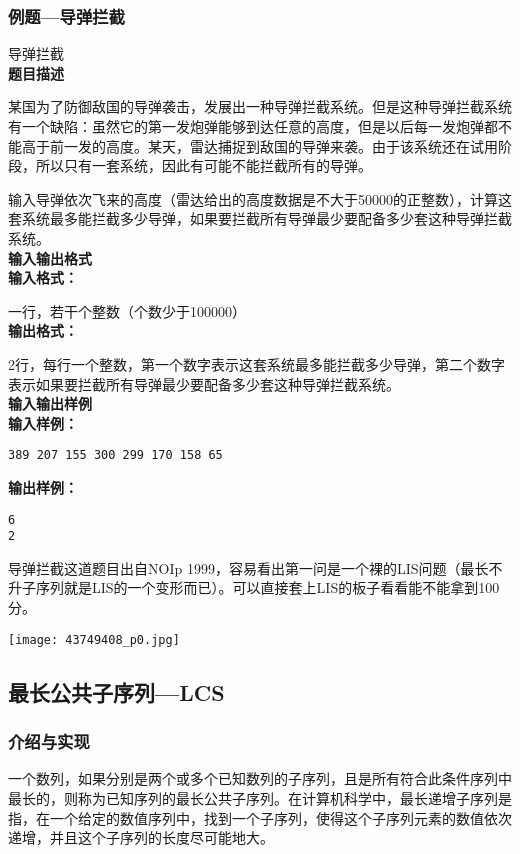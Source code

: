 \subsubsection{例题---导弹拦截}
\begin{example}导弹拦截\\
	\textbf{题目描述}

	某国为了防御敌国的导弹袭击，发展出一种导弹拦截系统。但是这种导弹拦截系统有一个缺陷：虽然它的第一发炮弹能够到达任意的高度，但是以后每一发炮弹都不能高于前一发的高度。某天，雷达捕捉到敌国的导弹来袭。由于该系统还在试用阶段，所以只有一套系统，因此有可能不能拦截所有的导弹。

	输入导弹依次飞来的高度（雷达给出的高度数据是不大于50000的正整数），计算这套系统最多能拦截多少导弹，如果要拦截所有导弹最少要配备多少套这种导弹拦截系统。\\
	\textbf{输入输出格式}
	\ \\
	\textbf{输入格式：}

	一行，若干个整数（个数少于100000）
	\ \\
	\textbf{输出格式：}

	2行，每行一个整数，第一个数字表示这套系统最多能拦截多少导弹，第二个数字表示如果要拦截所有导弹最少要配备多少套这种导弹拦截系统。
	\ \\
	\textbf{输入输出样例}
	\ \\
	\textbf{输入样例：}
	\begin{verbatim}
389 207 155 300 299 170 158 65
\end{verbatim}
	\textbf{输出样例：}
	\begin{verbatim}
6
2
\end{verbatim}
\end{example}

导弹拦截这道题目出自NOIp 1999，容易看出第一问是一个裸的LIS问题（最长不升子序列就是LIS的一个变形而已）。可以直接套上LIS的板子看看能不能拿到100分。

\begin{center}\texttt{[image: 43749408\_p0.jpg]}\end{center}
\note
\subsection{最长公共子序列---LCS}
\subsubsection{介绍与实现}
\begin{definition}[最长公共子序列]
一个数列，如果分别是两个或多个已知数列的子序列，且是所有符合此条件序列中最长的，则称为已知序列的最长公共子序列。在计算机科学中，最长递增子序列是指，在一个给定的数值序列中，找到一个子序列，使得这个子序列元素的数值依次递增，并且这个子序列的长度尽可能地大。
\end{definition}

